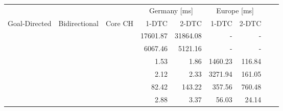 \begin{tabular}{cccrrrrrr}
	\toprule
	              &               &         & \multicolumn{2}{c}{Germany [\si{\milli\second}]} & \multicolumn{2}{c}{Europe [\si{\milli\second}]}                 \\
	Goal-Directed & Bidirectional & Core CH & 1-DTC                                            & 2-DTC                                           & 1-DTC & 2-DTC \\
	\midrule
	\xmark        & \xmark        & \xmark  & 17601.87                                                & 31864.08                                               & -     & -     \\
	\xmark        & \cmark        & \xmark  & 6067.46                                                & 5121.16                                               & -     & -     \\
	\cmark        & \xmark        & \xmark  & 1.53                                                & 1.86                                               & 1460.23     & 116.84     \\
	\cmark        & \cmark        & \xmark  & 2.12                                                & 2.33                                               & 3271.94     & 161.05     \\
	\xmark        & \cmark        & \cmark  & 82.42                                                & 143.22                                               & 357.56     & 760.48     \\
	\cmark        & \cmark        & \cmark  & 2.88                                                & 3.37                                               & 56.03     & 24.14     \\
	\bottomrule
\end{tabular}